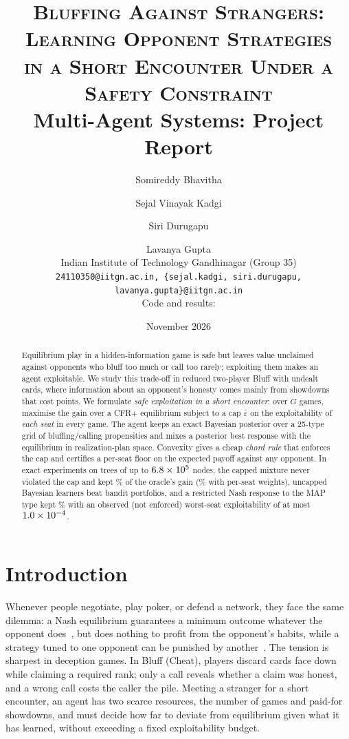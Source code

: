 \documentclass[11pt]{article}
\title{\textsc{Bluffing Against Strangers: Learning Opponent Strategies\\ in a Short Encounter Under a Safety Constraint}\\[3pt]
\large Multi-Agent Systems: Project Report}
\author{Somireddy Bhavitha \and Sejal Vinayak Kadgi \and Siri Durugapu \and Lavanya Gupta\\
\small Indian Institute of Technology Gandhinagar \quad (Group 35)\\
\small \texttt{24110350@iitgn.ac.in, \{sejal.kadgi, siri.durugapu, lavanya.gupta\}@iitgn.ac.in}\\
\small Code and results: \repourl}
\date{November 2026}
\newcommand{\eps}{\varepsilon}
\newcommand{\epsbar}{\bar{\eps}}
\begin{document}
\maketitle
\thispagestyle{fancy}
\vspace{-1.5em}
\begin{abstract}
Equilibrium play in a hidden-information game is safe but leaves value unclaimed against opponents who bluff too much or call too rarely; exploiting them makes an agent exploitable. We study this trade-off in reduced two-player Bluff with undealt cards, where information about an opponent's honesty comes mainly from showdowns that cost points. We formulate \emph{safe exploitation in a short encounter}: over $G$ games, maximise the gain over a CFR+ equilibrium subject to a cap $\epsbar$ on the exploitability of \emph{each seat} in every game. The agent keeps an exact Bayesian posterior over a 25-type grid of bluffing/calling propensities and mixes a posterior best response with the equilibrium in realization-plan space. Convexity gives a cheap \emph{chord rule} that enforces the cap and certifies a per-seat floor on the expected payoff against any opponent. In exact experiments on trees of up to $6.8\times10^5$ nodes, the capped mixture never violated the cap and kept \RsafeShare\% of the oracle's gain (\RseatShare\% with per-seat weights), uncapped Bayesian learners beat bandit portfolios, and a restricted Nash response to the MAP type kept \RrnrShare\% with an observed (not enforced) worst-seat exploitability of at most $1.0\times10^{-4}$.
\end{abstract}

\section{Introduction}
Whenever people negotiate, play poker, or defend a network, they face the same dilemma: a Nash equilibrium guarantees a minimum outcome whatever the opponent does~\cite{shoham2008}, but does nothing to profit from the opponent's habits, while a strategy tuned to one opponent can be punished by another~\cite{ganzfried2015}. The tension is sharpest in deception games. In Bluff (Cheat), players discard cards face down while claiming a required rank; only a call reveals whether a claim was honest, and a wrong call costs the caller the pile. Meeting a stranger for a short encounter, an agent has two scarce resources, the number of games and paid-for showdowns, and must decide how far to deviate from equilibrium given what it has learned, without exceeding a fixed exploitability budget.
\end{document}
